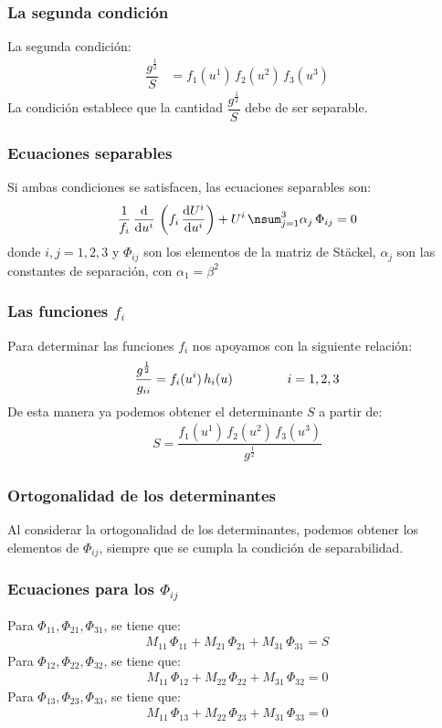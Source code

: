 \documentclass[12pt]{beamer}
\begin{document}
\begin{frame}
\frametitle{La segunda condición}
La segunda condición:
\pause
\begin{align*}
\dfrac{g^{\frac{1}{2}}}{S} &= f_{1} (u^{1}) \, f_{2} (u^{2}) \, f_{3} (u^{3})
\end{align*}
La condición establece que la cantidad $\dfrac{g^{\frac{1}{2}}}{S}$ debe de ser separable.
\end{frame}
\begin{frame}
\frametitle{Ecuaciones separables}
Si ambas condiciones se satisfacen, las ecuaciones separables son:
\pause
\begin{align}
\dfrac{1}{f_{i}} \, \dv{u^{i}} \, \left( f_{i} \, \dv{U^{i}}{u^{i}} \right) + U^{i} \, \nsum_{j=1}^{3} \alpha_{j} \, \Phi_{ij} = 0
\label{ec:ecuacion_Helmholtz}
\end{align}
\pause
donde $i, j = 1, 2, 3$ y $\Phi_{ij}$ son los elementos de la matriz de Stäckel, $\alpha_{j}$ son las constantes de separación, con $\alpha_{1} = \beta^{2}$
\end{frame}
\begin{frame}
\frametitle{Las funciones $f_{i}$}
Para determinar las funciones $f_{i}$ nos apoyamos con la siguiente relación:
\pause
\begin{align*}
\dfrac{g^{\frac{1}{2}}}{g_{ii}} = f_{i} (u^{i}) \, h_{i}(u) \hspace{1.5cm} i = 1, 2, 3
\end{align*}
\pause
De esta manera ya podemos obtener el determinante $S$ a partir de:
\pause
\begin{align*}
S = \dfrac{f_{1} (u^{1}) \, f_{2} (u^{2}) \, f_{3} (u^{3})}{g^{\frac{1}{2}}}
\end{align*}
\end{frame}
\begin{frame}
\frametitle{Ortogonalidad de los determinantes}
Al considerar la ortogonalidad de los determinantes, podemos obtener los elementos de $\Phi_{ij}$, siempre que se cumpla la condición de separabilidad.
\end{frame}
\begin{frame}
\frametitle{Ecuaciones para los $\Phi_{ij}$}
Para $\Phi_{11}, \Phi_{21}, \Phi_{31}$, se tiene que:
\pause
\begin{align*}
M_{11} \, \Phi_{11} + M_{21} \, \Phi_{21} + M_{31} \, \Phi_{31} = S
\end{align*}
\pause
Para $\Phi_{12}, \Phi_{22}, \Phi_{32}$, se tiene que:
\pause
\begin{align*}
M_{11} \, \Phi_{12} + M_{22} \, \Phi_{22} + M_{31} \, \Phi_{32} = 0
\end{align*}
\pause
Para $\Phi_{13}, \Phi_{23}, \Phi_{33}$, se tiene que:
\pause
\begin{align*}
M_{11} \, \Phi_{13} + M_{22} \, \Phi_{23} + M_{31} \, \Phi_{33} = 0
\end{align*}
\end{frame}
\end{document}

